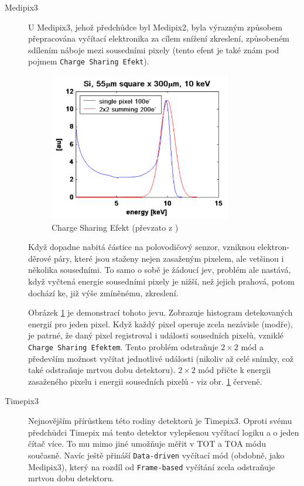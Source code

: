 \begin{description}
	\item[Medipix3] U Medipix3, jehož předchůdce byl Medipix2, byla výrazným způsobem přepracována vyčítací elektronika za cílem snížení zkreslení, způsobeném sdílením náboje mezi sousedními pixely (tento efent je také znám pod pojmem \texttt{Charge Sharing Efekt}). 

	\begin{figure}[th]
	\begin{center}
		\includegraphics[width=8cm]{figures/det_charge_sharing.png}
		\caption{Charge Sharing Efekt (převzato z \cite{medipix-www})}
		\label{fig:det:charge_sharing}
	\end{center}
	\end{figure}

	Když dopadne nabitá částice na polovodičový senzor, vzniknou elektron-děrové páry, které jsou staženy nejen zasaženým pixelem, ale vetšinou i několika sousedními. To samo o sobě je žádoucí jev, problém ale nastává, když vyčtená energie sousedními pixely je nižší, než jejich prahová, potom dochází ke, již výše zmíněnému, zkreslení. 
	
	Obrázek \ref{fig:det:charge_sharing} je demonstrací tohoto jevu. Zobrazuje histogram detekovaných energií pro jeden pixel. Když každý pixel operuje zcela nezávisle (modře), je patrné, že daný pixel registroval i události sousedních pixelů, vzniklé \texttt{Charge Sharing Efektem}. Tento problém odstraňuje $2\times2$ mód a především možnost vyčítat jednotlivé události (nikoliv až celé snímky, což také odstraňuje mrtvou dobu detektoru). $2\times2$ mód přičte k energii zasaženého pixelu i energii sousedních pixelů - viz obr. \ref{fig:det:charge_sharing} červeně.

	\item[Timepix3] Nejnovějším přírůstkem této rodiny detektorů je Timepix3. Oproti svému předchůdci Timepix má tento detektor vylepšenou vyčítací logiku a o jeden čítač více. To mu mimo jiné umožňuje měřit v TOT a TOA módu současně. Navíc ještě přináší \texttt{Data-driven} vyčítací mód (obdobně, jako Medipix3), který na rozdíl od \texttt{Frame-based} vyčítání zcela odstraňuje mrtvou dobu detektoru.

\end{description}

